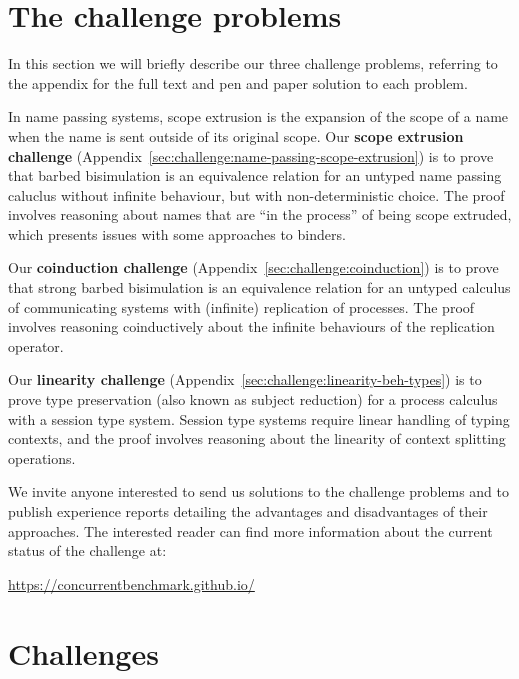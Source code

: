 \documentclass[adraft,copyright,creativecommons]{eptcs}
\begin{document}
\section{The challenge problems}
In this section we will briefly describe our three challenge problems, referring to the appendix for the full text and pen and paper solution to each problem.

In name passing systems, scope extrusion is the expansion of the scope of a name when the name is sent outside of its original scope.
Our \textbf{scope extrusion challenge} (Appendix~\ref{sec:challenge:name-passing-scope-extrusion}) is to prove that barbed bisimulation is an equivalence relation for an untyped name passing caluclus without infinite behaviour, but with non-deterministic choice.
The proof involves reasoning about names that are ``in the process'' of being scope extruded, which presents issues with some approaches to binders.

Our \textbf{coinduction challenge} (Appendix~\ref{sec:challenge:coinduction}) is to prove that strong barbed bisimulation is an equivalence relation for an untyped calculus of communicating systems with (infinite) replication of processes.
The proof involves reasoning coinductively about the infinite behaviours of the replication operator.

Our \textbf{linearity challenge} (Appendix~\ref{sec:challenge:linearity-beh-types}) is to prove type preservation (also known as subject reduction) for a process calculus with a session type system.
Session type systems require linear handling of typing contexts, and the proof involves reasoning about the linearity of context splitting operations.

We invite anyone interested to send us solutions to the challenge problems and to publish experience reports detailing the advantages and disadvantages of their approaches.
The interested reader can find more information about the current status of the challenge at:
\begin{center}
  \url{https://concurrentbenchmark.github.io/}
\end{center}


% 


\appendix

\section{Challenges}

\end{document}

